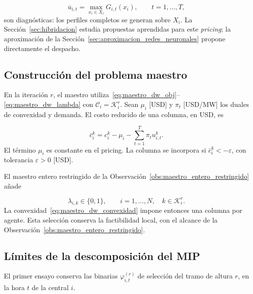 \begin{equation}
    \overline u_{i,t}
    =
    \max_{x_i\in X_i} G_{i,t}(x_i),
    \qquad t=1,\ldots,T,
    \label{eq:maximo_producible_periodo}
\end{equation}
son diagnósticas: los perfiles completos se generan sobre $X_i$. La Sección~\ref{sec:hibridacion} estudia propuestas aprendidas para este \emph{pricing}; la aproximación de la Sección~\ref{sec:aproximacion_redes_neuronales} propone directamente el despacho.

\subsection{Construcci\'on del problema maestro}
\label{subsec:construccion_problema_maestro}

En la iteración $r$, el maestro utiliza~\eqref{eq:maestro_dw_obj}--\eqref{eq:maestro_dw_lambda} con $\mathcal C_i=\mathcal K_i^r$. Sean $\mu_i$ [USD] y $\pi_t$ [USD/MW] los duales de convexidad y demanda. El costo reducido de una columna, en USD, es

\begin{equation}
    \bar c_i^k
    =
    c_i^k
    -
    \mu_i
    -
    \sum_{t=1}^{T}\pi_t u_{i,t}^{k}.
    \label{eq:costo_reducido_columna}
\end{equation}
El término $\mu_i$ es constante en el pricing. La columna se incorpora si $\bar c_i^k<-\varepsilon$, con tolerancia $\varepsilon>0$ [USD].

El maestro entero restringido de la Observación~\ref{obs:maestro_entero_restringido} añade

\begin{equation}
    \lambda_{i,k}\in\{0,1\},
    \qquad i=1,\ldots,N,\quad k\in\mathcal{K}_i^r.
    \label{eq:maestro_dw_binario}
\end{equation}
La convexidad~\eqref{eq:maestro_dw_convexidad} impone entonces una columna por agente. Esta selección conserva la factibilidad local, con el alcance de la Observación~\ref{obs:maestro_entero_restringido}.

\subsection{Límites de la descomposición del MIP}
\label{subsec:intento_binario_dw}

El primer ensayo conserva las binarias $\varphi_{i,t}^{(r)}$ de selección del tramo de altura $r$, en la hora $t$ de la central $i$.

